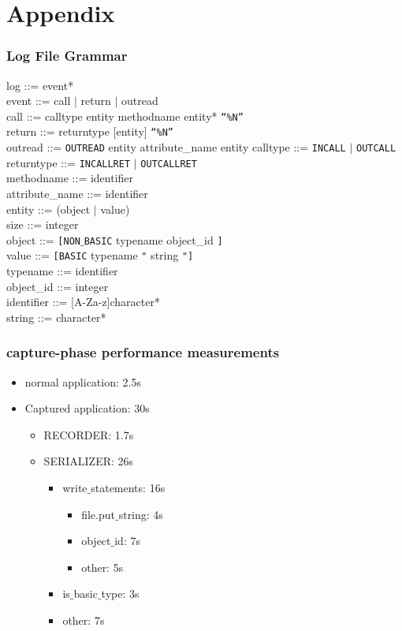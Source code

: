 \documentclass[a4paper,10pt]{report}
\begin{document}
\chapter{Appendix}

\subsection{Log File Grammar}

log ::= event* \\
event ::= call $\mid$ return $\mid$ outread\\
call ::= calltype entity methodname entity* \texttt{“\%N”} \\
return ::= returntype [entity]  \texttt{“\%N”}\\
outread ::= \texttt{OUTREAD} entity attribute\_name entity
calltype ::= \texttt{INCALL} $\mid$ \texttt{OUTCALL} \\
returntype ::= \texttt{INCALLRET} $\mid$ \texttt{OUTCALLRET} \\
methodname ::= identifier \\
attribute\_name ::= identifier \\
entity ::= (object $\mid$ value) \\
size ::= integer \\
object ::= \texttt{[NON$\_$BASIC} typename object\_id \texttt{]} \\
value ::= \texttt{[BASIC} typename \texttt{"} string \texttt{"]} \\
typename ::= identifier \\
object\_id ::= integer\\
identifier ::= [A-Za-z]character*\\
string ::= character*\\

\subsection{capture-phase performance measurements}
\begin{itemize}
	\item normal application: 2.5s
	\item Captured application: 30s
	\begin{itemize}
		\item RECORDER: 1.7s\\
		\item SERIALIZER: 26s
		\begin{itemize}
			\item write$\_$statements: 16s
			\begin{itemize}
				\item file.put$\_$string: 4s
				\item object$\_$id: 7s
				\item other: 5s
			\end{itemize}
			\item is$\_$basic$\_$type: 3s
			\item other: 7s
		\end{itemize}
	\end{itemize}
\end{itemize}

 

\end{document}
